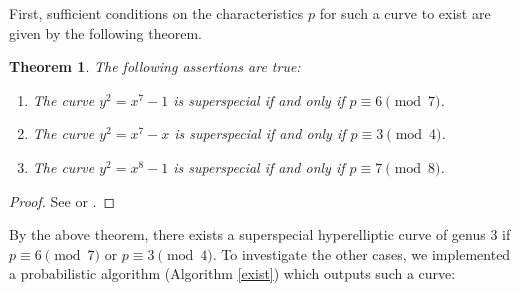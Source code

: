 \documentclass{amsart}
\theoremstyle{definition}
\theoremstyle{plain}
\newtheorem{Thm}[Def]{Theorem}
\begin{document}
First, sufficient conditions on the characteristics $p$ for such a curve to exist are given by the following theorem.
\begin{Thm}
The following assertions are true:\smallskip
\begin{enumerate}
\item The curve $y^2 = x^7-1$ is superspecial if and only if $p \equiv 6 \pmod{7}$.
\item The curve $y^2 = x^7-x$ is superspecial if and only if $p \equiv 3 \pmod{4}$.
\item The curve $y^2 = x^8-1$ is superspecial if and only if $p \equiv 7 \pmod{8}$.
\end{enumerate}
\end{Thm}
\begin{proof}
See \cite[Theorem 2]{Valentini} or \cite[Theorem 3.15]{Brock}.
\end{proof}

By the above theorem, there exists a superspecial hyperelliptic curve of genus $3$ if $p \equiv  6 \pmod{7}$ or $p \equiv 3 \pmod{4}$. To investigate the other cases, we implemented a probabilistic algorithm (Algorithm \ref{exist}) which outputs such a curve:\vspace{-0.9mm}
\end{document}
